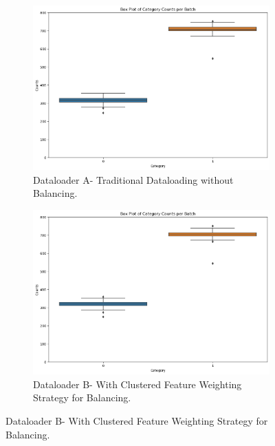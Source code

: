 \begin{figure}[htbp]
    \centering
    \begin{subfigure}[b]{0.7\textwidth}
        \includegraphics[width=\textwidth]{Images_Thesis/Dataloader_comp/Images_0_02/output_box_0_02_d_a.png}
        \caption{Dataloader A- Traditional Dataloading without Balancing.}
        \label{fig:Box plot for 0_02 experiment with dataloader A}
    \end{subfigure}
    \hfill %
    \begin{subfigure}[b]{0.7\textwidth}
        \includegraphics[width=\textwidth]{Images_Thesis/Dataloader_comp/Images_0_02/output_KL_0_02_d_b.png}
        \caption{Dataloader B- With Clustered Feature Weighting Strategy for Balancing.}
        \label{fig:Box plot for 0_02 experiment with dataloader B (novel)}
    \end{subfigure}


\end{figure}
